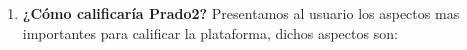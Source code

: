 \begin{enumerate}
\begin{itemize}
        \end{itemize}


  \item \textbf{¿Cómo calificaría Prado2?} Presentamos al usuario los aspectos mas importantes para calificar la plataforma, dichos aspectos son:


\end{enumerate}

